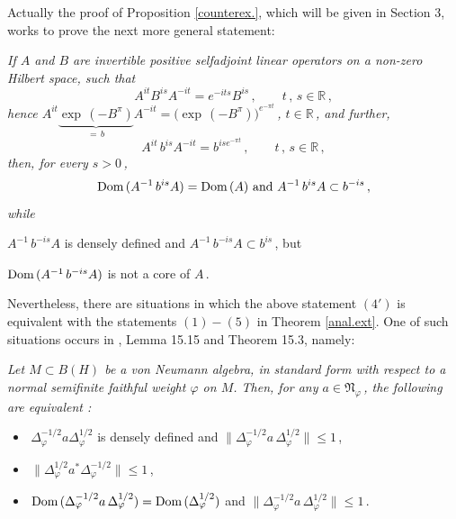 \documentclass[reqno]{amsart}
\theoremstyle{definition}
\theoremstyle{remark}
\numberwithin{equation}{section}
\theoremstyle{plain}
\begin{document}
 Actually the proof of Proposition
\ref{counterex.}, which will be given in Section 3, works to
prove the next more general statement:
\smallskip

{\it If $A$ and $B$ are invertible positive selfadjoint linear
operators on a non-zero Hilbert space, such that
\begin{equation*}
A^{it}B^{is}A^{-it} =e^{-its} B^{is}\, ,\qquad t\, ,\, s\in
\mathbb R\, ,
\end{equation*}
hence $A^{it}\underbrace{\exp\, (-B^\pi )}_{=\, b} A^{-it} =
\big(\exp\, (-B^\pi )\big)^{e^{-\pi t}}\,$, $t\in\mathbb R\,$,
and further,
\begin{equation*}
A^{it}\, b^{is} A^{-it} =b^{ise^{-\pi t}}\, ,\qquad t\, ,\, s
\in\mathbb R\, ,
\end{equation*}
then, for every $s>0\,$,
\begin{equation*}
\text{\rm Dom}\, (A^{-1}\, b^{is} A) =\text{\rm Dom}\, (A)
\text{ and }A^{-1}\, b^{is} A\subset b^{-is}\, ,
\end{equation*}
while

\noindent\hspace{2.45 cm} $A^{-1}\, b^{-is} A$ is densely defined
and $A^{-1}\, b^{-is} A\subset b^{is}\,$, but

\noindent\hspace{2.45 cm} $\text{\rm Dom}\, (A^{-1}\, b^{-is} A)$
is not a core of $A\,$.}
\medskip

Nevertheless, there are situations in which the above statement
$(4')$ is equivalent with the statements $(1) - (5)$ in Theorem
\ref{anal.ext}.
One of such situations occurs in \cite{T1}, Lemma 15.15 and
Theorem 15.3, namely:
\smallskip

{\it Let $M\subset B(H)$ be a von Neumann algebra, in standard
form with respect to a normal semifinite faithful weight $\varphi$
on $M$. Then, for any $a\in\mathfrak N_\varphi\,$, the following
are equivalent {\rm :}
\begin{itemize}
\item[(a)] $\,\Delta_\varphi^{-1/2} a\Delta_\varphi^{1/2}$ is
densely defined and $\|\Delta_\varphi^{-1/2}a\,\Delta_\varphi^{1/2}
\|\leq 1\,$,
\item[(b)] $\,\|\Delta_\varphi^{1/2} a^*\Delta_\varphi^{-1/2}\|
\leq 1\,$,
\item[(c)] $\,\text{\rm Dom}\, (\Delta_\varphi^{-1/2} a\,
\Delta_\varphi^{1/2}) =\text{\rm Dom}\, (\Delta_\varphi^{1/2})$
and $\|\Delta_\varphi^{-1/2} a\,\Delta_\varphi^{1/2}\|\leq 1\,$.
\end{itemize}}
\smallskip
\end{document}
